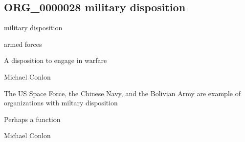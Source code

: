 \documentclass[letterpaper,10pt,english]{sphinxmanual}
\begin{document}
\subsection{ORG\_0000028 \sphinxhyphen{} military disposition}
\label{\detokenize{doc-ORG_0000028:org-0000028-military-disposition}}\label{\detokenize{doc-ORG_0000028:index-0}}\label{\detokenize{doc-ORG_0000028::doc}}
\begin{sphinxShadowBox}

\sphinxAtStartPar
military disposition
\end{sphinxShadowBox}

\begin{sphinxShadowBox}

\sphinxAtStartPar
armed forces
\end{sphinxShadowBox}

\begin{sphinxShadowBox}

\sphinxAtStartPar
A disposition to engage in warfare
\end{sphinxShadowBox}

\begin{sphinxShadowBox}

\sphinxAtStartPar
Michael Conlon 
\end{sphinxShadowBox}

\begin{sphinxShadowBox}

\sphinxAtStartPar
The US Space Force, the Chinese Navy, and the Bolivian Army are example of organizations with miltary disposition
\end{sphinxShadowBox}

\begin{sphinxShadowBox}

\sphinxAtStartPar
Perhaps a function
\end{sphinxShadowBox}

\begin{sphinxShadowBox}

\sphinxAtStartPar
Michael Conlon 
\end{sphinxShadowBox}
\begin{quote}

\ignorespaces \end{quote}
\end{document}
